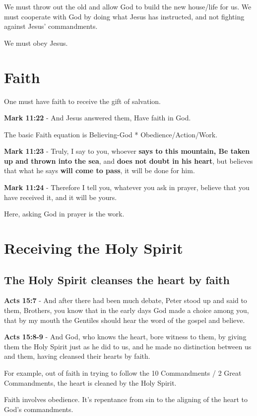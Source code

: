 \documentclass[11pt]{article}
\begin{document}
We must throw out the old and allow God to build the new house/life for us.
We must cooperate with God by doing what Jesus has instructed, and not fighting against Jesus' commandments.

We must obey Jesus.

\section{Faith}
\label{sec:org2e1c6c4}
One must have faith to receive the gift of salvation.

\textbf{Mark 11:22} - And Jesus answered them, Have faith in God.

The basic Faith equation is Believing-God * Obedience/Action/Work.

\textbf{Mark 11:23} - Truly, I say to you, whoever \textbf{says to this mountain, Be taken up and thrown into the sea}, and \textbf{does not doubt in his heart}, but believes that what he says \textbf{will come to pass}, it will be done for him.

\textbf{Mark 11:24} - Therefore I tell you, whatever you ask in prayer, believe that you have received it, and it will be yours.

Here, asking God in prayer is the work.

\section{Receiving the Holy Spirit}
\label{sec:orgf5a2c35}
\subsection{The Holy Spirit cleanses the heart by faith}
\label{sec:orgc902ba7}
\textbf{Acts 15:7} - And after there had been much debate, Peter stood up and said to them, Brothers, you know that in the early days God made a choice among you, that by my mouth the Gentiles should hear the word of the gospel and believe.

\textbf{Acts 15:8-9} - And God, who knows the heart, bore witness to them, by giving them the Holy Spirit just as he did to us, and he made no distinction between us and them, having cleansed their hearts by faith.

For example, out of faith in trying to follow the 10 Commandments / 2 Great Commandments, the heart is cleaned by the Holy Spirit.

Faith involves obedience. It's repentance from sin to the aligning of the heart to God's commandments.
\end{document}
